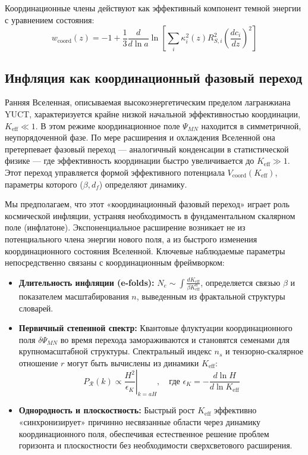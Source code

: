 \documentclass[11pt,a4paper]{article}
\begin{document}
	Координационные члены действуют как эффективный компонент темной энергии с уравнением состояния:
	\begin{equation}
		w_{\text{coord}}(z) = -1 + \frac{1}{3} \frac{d}{d\ln a} \ln \left[ \sum_i \kappa_i^2(z) R_{S,i}^2 \left(\frac{dc_i}{dz}\right)^2 \right]
	\end{equation}
	
	
	\subsection{Инфляция как координационный фазовый переход}
	\label{subsec:inflation-transition}
	
	Ранняя Вселенная, описываемая высокоэнергетическим пределом лагранжиана YUCT, характеризуется крайне низкой начальной эффективностью координации, \(K_{\mathrm{eff}} \ll 1\). В этом режиме координационное поле \(\Psi_{MN}\) находится в симметричной, неупорядоченной фазе. По мере расширения и охлаждения Вселенной она претерпевает фазовый переход — аналогичный конденсации в статистической физике — где эффективность координации быстро увеличивается до \(K_{\mathrm{eff}} \gg 1\). Этот переход управляется формой эффективного потенциала \(V_{\mathrm{coord}}(K_{\mathrm{eff}})\), параметры которого (\(\beta, d_f\)) определяют динамику.
	
	Мы предполагаем, что этот «координационный фазовый переход» играет роль космической инфляции, устраняя необходимость в фундаментальном скалярном поле (инфлатоне). Экспоненциальное расширение возникает не из потенциального члена энергии нового поля, а из быстрого изменения координационного состояния Вселенной. Ключевые наблюдаемые параметры непосредственно связаны с координационным фреймворком:
	
	\begin{itemize}
		\item \textbf{Длительность инфляции (e-folds):} \(N_e \sim \int \frac{dK_{\mathrm{eff}}}{\beta K_{\mathrm{eff}}^n} \), определяется связью \(\beta\) и показателем масштабирования \(n\), выведенным из фрактальной структуры словарей.
		\item \textbf{Первичный степенной спектр:} Квантовые флуктуации координационного поля \(\delta \Psi_{MN}\) во время перехода замораживаются и становятся семенами для крупномасштабной структуры. Спектральный индекс \(n_s\) и тензорно-скалярное отношение \(r\) могут быть вычислены из динамики \(K_{\mathrm{eff}}\):
		\begin{equation}
			P_{\mathcal{R}}(k) \propto \left. \frac{H^2}{\epsilon_K} \right|_{k=aH}, \quad \text{где } \epsilon_K = -\frac{d\ln H}{d\ln K_{\mathrm{eff}}}
		\end{equation}
		\item \textbf{Однородность и плоскостность:} Быстрый рост \(K_{\mathrm{eff}}\) эффективно «синхронизирует» причинно несвязанные области через динамику координационного поля, обеспечивая естественное решение проблем горизонта и плоскостности без необходимости сверхсветового расширения.
	\end{itemize}
	
\end{document}
